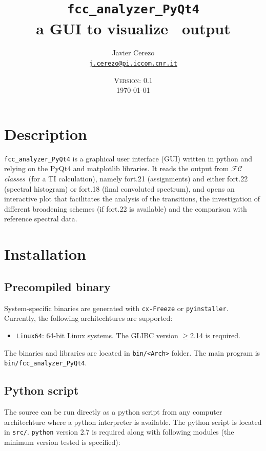\documentclass[a4paper,11pt]{article}
\title{\texttt{fcc\_analyzer\_PyQt4}\\ a GUI to visualize \fcc\ output}
\date{\textsc{Version: 0.1}\\\today}
\author{Javier Cerezo\\\href{mailto:j.cerezo@pi.iccom.cnr.it}{\texttt{j.cerezo@pi.iccom.cnr.it}}}
\begin{document}
\setlength{\parskip}{0.5em}
\newcommand{\fcc}{$\mathcal{FC}$\textit{classes}}

\maketitle

\section{Description}
\texttt{fcc\_analyzer\_PyQt4} is a graphical user interface (GUI) written in python and relying on the PyQt4 and matplotlib libraries. It reads the output from \fcc\ (for a TI calculation), namely fort.21 (assignments) and either fort.22 (spectral histogram) or fort.18 (final convoluted spectrum), and opens an interactive plot that facilitates the analysis of the transitions, the investigation of different broadening schemes (if fort.22 is available) and the comparison with reference spectral data.

\section{Installation}

\subsection{Precompiled binary}
System-specific binaries are generated with \texttt{cx-Freeze} or \texttt{pyinstaller}. Currently, the following architechtures are supported: 

\begin{itemize}
 \item \texttt{Linux64}: 64-bit Linux systems. The GLIBC version $\geq$2.14 is required.
\end{itemize}

The binaries and libraries are located in \texttt{bin/<Arch>} folder. The main program is \texttt{bin/fcc\_analyzer\_PyQt4}.

\subsection{Python script}
The source can be run directly as a python script from any computer architechture where a python interpreter is available. The python script is located in \texttt{src/}. \texttt{python} version 2.7 is required along with following modules (the minimum version tested is specified):
\end{document}
